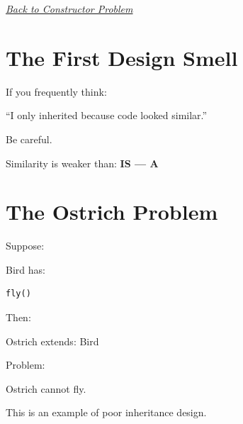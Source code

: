 \documentclass[11pt,a4paper]{book}
\begin{document}
\smallskip
\noindent
\hyperref[sec:inheritance_constructor_problem]{\emph{Back to Constructor Problem}}


\section{The First Design Smell}

\begin{trap}

If you frequently think:

\begin{center}
``I only inherited because code looked similar.''
\end{center}

Be careful.

\end{trap}


Similarity is weaker than: \textbf{IS --- A}


\section{The Ostrich Problem}\label{sec:inheritance_ostrich_problem}

Suppose:

\textcolor{RosettaBlue}{Bird} has:

\begin{verbatim}
fly()
\end{verbatim}


Then:

Ostrich \textcolor{RosettaOrange}{extends}: \textcolor{RosettaBlue}{Bird}


Problem:

\textcolor{RosettaBlue}{Ostrich} \textcolor{RosettaRed}{cannot} fly.


This is an example of poor inheritance design.

\end{document}
